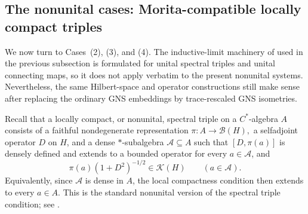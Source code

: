 \documentclass[11pt]{amsart}
\theoremstyle{definition}
\theoremstyle{remark}
\begin{document}
\subsection{The nonunital cases: Morita-compatible locally compact triples}
\label{subsec:nonunital-morita-compatible}

We now turn to Cases~\textup{(2)}, \textup{(3)}, and \textup{(4)}. The
inductive-limit machinery of \cite{FloricelGhorbanpour} used in the previous
subsection is formulated for unital spectral triples and unital connecting maps,
so it does not apply verbatim to the present nonunital systems. Nevertheless,
the same Hilbert-space and operator constructions still make sense after replacing the ordinary GNS embeddings by trace-rescaled GNS isometries.


Recall that a locally compact, or nonunital, spectral triple on a $C^*$-algebra
$A$ consists of a faithful nondegenerate representation $\pi\colon A\to\mathcal B(H),$
a selfadjoint operator $D$ on \(H\), and a dense $*$-subalgebra $\mathcal A\subseteq A$
such that $[D,\pi(a)]$ is densely defined and extends to a bounded operator for every $a\in\mathcal A$,
and
\[
\pi(a)(1+D^2)^{-1/2}\in\mathcal K(H)
\qquad
(a\in\mathcal A).
\]
Equivalently, since $\mathcal A$ is dense in $A$, the local compactness
condition then extends to every $a\in A$. This is the standard nonunital
version of the spectral triple condition; see
\cite{Rennie, CareyGayralRennieSukochevLocallyCompact, CareyGayralPhillipsRennieSukochevNonunitalSF}.
\end{document}
